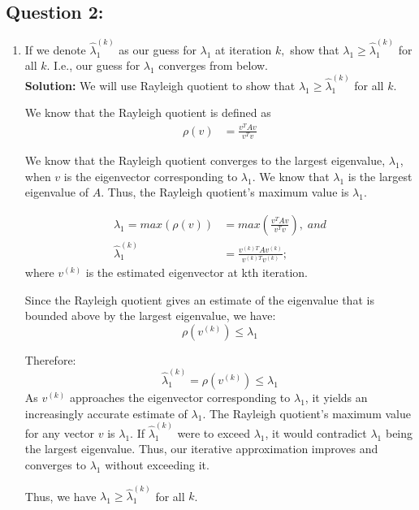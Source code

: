 \documentclass[11pt,onecolumn]{article}
\begin{document}
\subsection*{Question 2:}

\begin{enumerate}[label=(\alph*)]
	\item If we denote $\hat{\lambda}_1^{(k)}$ as our guess for $\lambda_1$ at iteration $k,$ show that $\lambda_1 \geq \hat{\lambda}_1^{(k)}$ for all $k.$ I.e., our guess for $\lambda_1$ converges from below. \\
	      \textbf{Solution:} We will use Rayleigh quotient to show that $\lambda_1 \geq \hat{\lambda}_1^{(k)}$ for all $k$.

	      We know that the Rayleigh quotient is defined as
	      \begin{align*}
		      \rho(v) & = \frac{v^TAv}{v^Tv}
	      \end{align*}

	      We know that the Rayleigh quotient converges to the largest eigenvalue, $\lambda_1$, when $v$ is the eigenvector corresponding to $\lambda_1$. We know that $\lambda_1$ is the largest eigenvalue of $A$. Thus, the Rayleigh quotient's maximum value is $\lambda_1$.

	      \begin{align*}
		      \lambda_1 = max(\rho(v)) & = max(\frac{v^TAv}{v^Tv}),\;and             \\
		      \hat{\lambda}_1^{(k)}    & = \frac{v^{(k)T}Av^{(k)}}{v^{(k)T}v^{(k)}};
	      \end{align*}
	      where $v^{(k)}$ is the estimated eigenvector at kth iteration.

	      Since the Rayleigh quotient gives an estimate of the eigenvalue that is bounded above by the largest eigenvalue, we have:
	      \[
	      \rho(v^{(k)}) \leq \lambda_1
	      \]

	      Therefore:
	      \[
	      \hat{\lambda}_1^{(k)} = \rho(v^{(k)}) \leq \lambda_1
	      \]
		  As $v^{(k)}$ approaches the eigenvector corresponding to $\lambda_1$, it yields an increasingly accurate estimate of $\lambda_1$. The Rayleigh quotient's maximum value for any vector $v$ is $\lambda_1$. If $\hat{\lambda}_1^{(k)}$ were to exceed $\lambda_1$, it would contradict $\lambda_1$ being the largest eigenvalue. Thus, our iterative approximation improves and converges to $\lambda_1$ without exceeding it.

		  Thus, we have $\lambda_1 \geq \hat{\lambda}_1^{(k)}$ for all $k$.


\end{enumerate}
\end{document}
